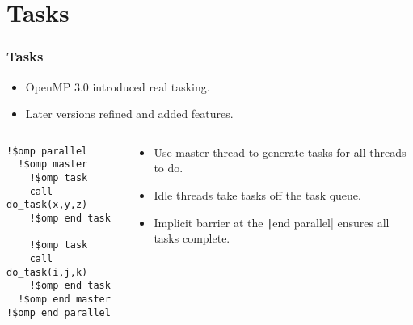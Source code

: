 \documentclass{beamer}
\begin{document}
\section{Tasks}
\begin{frame}[fragile]
\frametitle{Tasks}
\begin{itemize}
  \item OpenMP 3.0 introduced real tasking.
  \item Later versions refined and added features.
\end{itemize}

\begin{columns}
\begin{column}{0.5\textwidth}
\begin{verbatim}
!$omp parallel
  !$omp master
    !$omp task
    call do_task(x,y,z)
    !$omp end task

    !$omp task
    call do_task(i,j,k)
    !$omp end task
  !$omp end master
!$omp end parallel
\end{verbatim}
\end{column}

\begin{column}{0.5\textwidth}
\begin{itemize}
  \item Use master thread to generate tasks for all threads to do.
  \item Idle threads take tasks off the task queue.
  \item Implicit barrier at the \texttt|end parallel| ensures all tasks complete.
\end{itemize}
\end{column}
\end{columns}

\end{frame}
\end{document}
